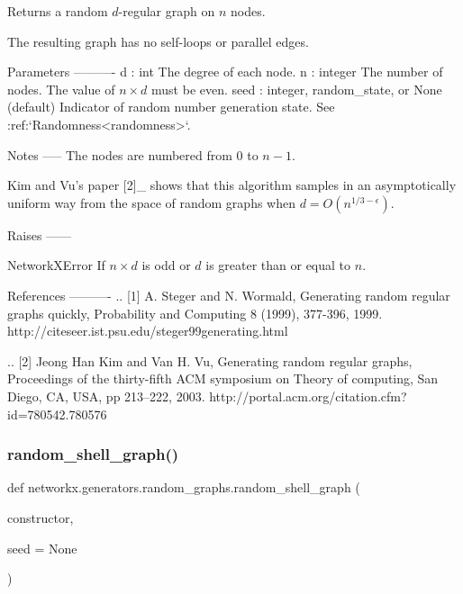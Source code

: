 \begin{DoxyVerb}Returns a random $d$-regular graph on $n$ nodes.

The resulting graph has no self-loops or parallel edges.

Parameters
----------
d : int
  The degree of each node.
n : integer
  The number of nodes. The value of $n \times d$ must be even.
seed : integer, random_state, or None (default)
    Indicator of random number generation state.
    See :ref:`Randomness<randomness>`.

Notes
-----
The nodes are numbered from $0$ to $n - 1$.

Kim and Vu's paper [2]_ shows that this algorithm samples in an
asymptotically uniform way from the space of random graphs when
$d = O(n^{1 / 3 - \epsilon})$.

Raises
------

NetworkXError
    If $n \times d$ is odd or $d$ is greater than or equal to $n$.

References
----------
.. [1] A. Steger and N. Wormald,
   Generating random regular graphs quickly,
   Probability and Computing 8 (1999), 377-396, 1999.
   http://citeseer.ist.psu.edu/steger99generating.html

.. [2] Jeong Han Kim and Van H. Vu,
   Generating random regular graphs,
   Proceedings of the thirty-fifth ACM symposium on Theory of computing,
   San Diego, CA, USA, pp 213--222, 2003.
   http://portal.acm.org/citation.cfm?id=780542.780576
\end{DoxyVerb}
 \mbox{\label{namespacenetworkx_1_1generators_1_1random__graphs_a674ef4e36f93607269fd256728beb214}} 
\subsubsection{\texorpdfstring{random\+\_\+shell\+\_\+graph()}{random\_shell\_graph()}}
{\footnotesize\ttfamily def networkx.\+generators.\+random\+\_\+graphs.\+random\+\_\+shell\+\_\+graph (\begin{DoxyParamCaption}\item[{}]{constructor,  }\item[{}]{seed = {\ttfamily None} }\end{DoxyParamCaption})}

